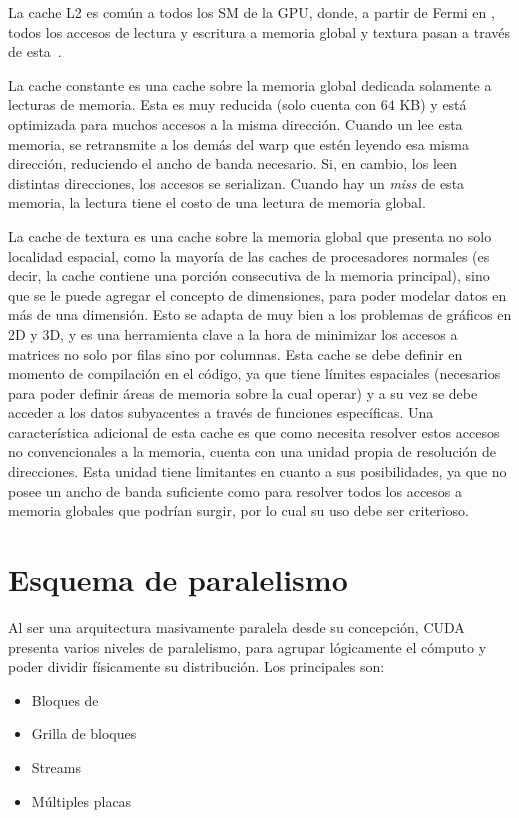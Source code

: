 La cache L2 es com\'un a todos los SM de la GPU, donde, a partir de Fermi en \nvidia{}, todos los accesos de lectura y escritura a memoria global y textura pasan a trav\'es de esta~\cite{NvidiaFermi}.

La cache constante es una cache sobre la memoria global dedicada solamente a lecturas de memoria.
Esta es muy reducida (solo cuenta con $64$ KB) y est\'a optimizada para muchos accesos a la misma direcci\'on.
Cuando un \thread{} lee esta memoria, se retransmite a los dem\'as \threads{} del warp que est\'en leyendo esa misma direcci\'on, reduciendo el ancho de banda necesario.
Si, en cambio, los \threads{} leen distintas direcciones, los accesos se serializan.
Cuando hay un \emph{miss} de esta memoria, la lectura tiene el costo de una lectura de memoria global.

La cache de textura es una cache sobre la memoria global que presenta no solo localidad espacial, como la mayor\'ia de las caches de procesadores normales (es decir, la cache contiene una porci\'on consecutiva de la memoria principal), sino que se le puede agregar el concepto de dimensiones, para poder modelar datos en m\'as de una dimensi\'on.
Esto se adapta de muy bien a los problemas de gr\'aficos en 2D y 3D, y es una herramienta clave a la hora de minimizar los accesos a matrices no solo por filas sino por columnas.
Esta cache se debe definir en momento de compilaci\'on en el c\'odigo, ya que tiene l\'imites espaciales (necesarios para poder definir \'areas de memoria sobre la cual operar) y a su vez se debe acceder a los datos subyacentes a trav\'es de funciones espec\'ificas.
Una caracter\'istica adicional de esta cache es que como necesita resolver estos accesos no convencionales a la memoria, cuenta con una unidad propia de resoluci\'on de direcciones. Esta unidad tiene limitantes en cuanto a sus posibilidades, ya que no posee un ancho de banda suficiente como para resolver todos los accesos a memoria globales que podr\'ian surgir, por lo cual su uso debe ser criterioso.


\section{Esquema de paralelismo}

Al ser una arquitectura masivamente paralela desde su concepci\'on, CUDA presenta varios niveles de paralelismo, para agrupar l\'ogicamente el c\'omputo y poder dividir f\'isicamente su distribuci\'on.
Los principales son:
\begin{itemize}
  \item Bloques de \threads{}
  \item Grilla de bloques
  \item Streams
  \item M\'ultiples placas
\end{itemize}

